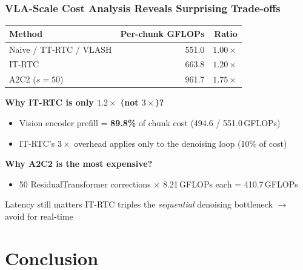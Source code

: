 \documentclass[aspectratio=1610]{beamer}
\begin{document}
\begin{frame}
\frametitle{VLA-Scale Cost Analysis Reveals Surprising Trade-offs}

\begin{table}
\centering
\footnotesize
\begin{tabular}{l r r}
\toprule
\textbf{Method} & \textbf{Per-chunk GFLOPs} & \textbf{Ratio} \\
\midrule
Naive / TT-RTC / VLASH & 551.0 & $1.00\times$ \\
IT-RTC & 663.8 & $1.20\times$ \\
A2C2 ($s{=}50$) & \alert{961.7} & \alert{$1.75\times$} \\
\bottomrule
\end{tabular}
\end{table}

\vspace{0.3em}
\textbf{Why IT-RTC is only $1.2\times$ (not $3\times$)?}
\begin{itemize}
    \item Vision encoder prefill = \textbf{89.8\%} of chunk cost (494.6 / 551.0\,GFLOPs)
    \item IT-RTC's $3\times$ overhead applies only to the denoising loop (10\% of cost)
\end{itemize}

\vspace{0.3em}
\textbf{Why A2C2 is the most expensive?}
\begin{itemize}
    \item 50 ResidualTransformer corrections $\times$ 8.21\,GFLOPs each = 410.7\,GFLOPs
\end{itemize}

\vspace{0.3em}
\begin{block}{Latency still matters}
IT-RTC triples the \emph{sequential} denoising bottleneck $\rightarrow$ avoid for real-time
\end{block}

\end{frame}
\section{Conclusion}
\end{document}
